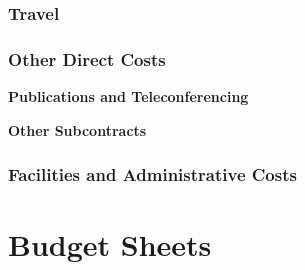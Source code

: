 \documentclass[12pt]{article}
\begin{document}
  
            \subsubsection{Travel} 


   \subsubsection{Other Direct Costs} 

{\bf Publications and Teleconferencing} \hspace{0.1in} 


{\bf Other Subcontracts} \hspace{0.1in} 

   \subsubsection{Facilities and Administrative Costs} 


\newpage

\section{Budget Sheets}
\end{document}
